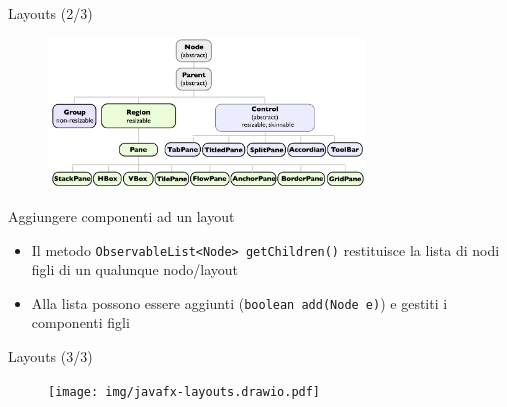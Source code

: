 \documentclass[xcolor=dvipsnames,presentation]{beamer}
\begin{document}
\begin{frame}{Layouts (2/3)}
\begin{figure}
\includegraphics[width=0.75\textwidth]{img/layouts.png}
\end{figure}

\begin{block}{Aggiungere componenti ad un layout}
\begin{itemize}
\item Il metodo \texttt{ObservableList<Node> getChildren()} restituisce la lista di nodi figli di un qualunque nodo/layout
\item Alla lista possono essere aggiunti (\texttt{boolean add(Node e)}) e gestiti i componenti figli
\end{itemize}
\end{block}
\end{frame}

\begin{frame}{Layouts (3/3)}

\begin{figure}
\centering
\texttt{[image: img/javafx-layouts.drawio.pdf]}
\end{figure}

\end{frame}
\end{document}
